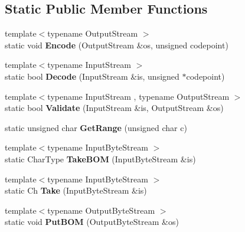 \subsection*{Static Public Member Functions}
\begin{DoxyCompactItemize}
\item 
\mbox{\label{structUTF8_af286ed19ca60d261a9b11b65bee1298b}} 
{\footnotesize template$<$typename Output\+Stream $>$ }\\static void {\bfseries Encode} (Output\+Stream \&os, unsigned codepoint)
\item 
\mbox{\label{structUTF8_a17c6badb31acf4f784111c886737fb17}} 
{\footnotesize template$<$typename Input\+Stream $>$ }\\static bool {\bfseries Decode} (Input\+Stream \&is, unsigned $\ast$codepoint)
\item 
\mbox{\label{structUTF8_a9e2e7e37d819baeb5e643654c6e61e33}} 
{\footnotesize template$<$typename Input\+Stream , typename Output\+Stream $>$ }\\static bool {\bfseries Validate} (Input\+Stream \&is, Output\+Stream \&os)
\item 
\mbox{\label{structUTF8_ac06bbf38df41adb0c7b9eaa93f85cc38}} 
static unsigned char {\bfseries Get\+Range} (unsigned char c)
\item 
\mbox{\label{structUTF8_a1b2359d6ea50ae32fefc9b28e9878a31}} 
{\footnotesize template$<$typename Input\+Byte\+Stream $>$ }\\static Char\+Type {\bfseries Take\+B\+OM} (Input\+Byte\+Stream \&is)
\item 
\mbox{\label{structUTF8_a5b2561a5031c8a699e593cd51b2c6864}} 
{\footnotesize template$<$typename Input\+Byte\+Stream $>$ }\\static Ch {\bfseries Take} (Input\+Byte\+Stream \&is)
\item 
\mbox{\label{structUTF8_a6b171e5f0662ad81d498875bbdbc536a}} 
{\footnotesize template$<$typename Output\+Byte\+Stream $>$ }\\static void {\bfseries Put\+B\+OM} (Output\+Byte\+Stream \&os)
\item 
\mbox{\label{structUTF8_ab24c23227413798e9be28a21eb26fe51}} 

\end{DoxyCompactItemize}
